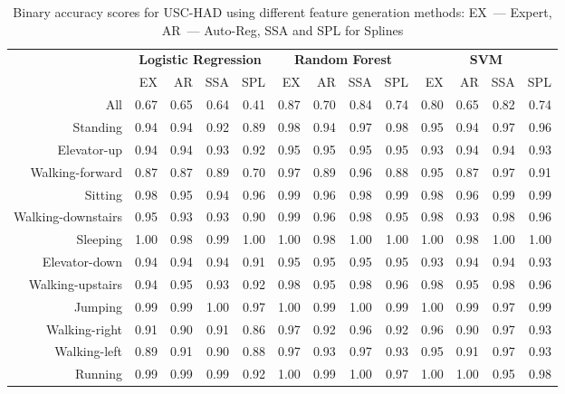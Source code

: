 \begin{table}[!ht]
	\centering
	\footnotesize
	\caption{Binary accuracy scores for USC-HAD using different feature generation methods: EX~--- Expert, AR~--- Auto-Reg, SSA and  SPL for Splines}
	\label{my-label}
	\begin{tabular}{r|rrrr|rrrr|rrrr|}
		& \multicolumn{4}{c|}{\textbf{Logistic Regression}} & \multicolumn{4}{c|}{\textbf{Random Forest}} & \multicolumn{4}{c|}{\textbf{SVM}}          \\ \cline{2-13} 
		& EX   & AR   & SSA   & SPL  & EX  & AR & SSA & SPL & EX & AR & SSA & SPL \\ \hline
		All& 0.67 & 0.65 & 0.64 & 0.41 & 0.87 & 0.70 & 0.84 & 0.74 & 0.80 & 0.65 & 0.82 & 0.74 \\
		Standing& 0.94 & 0.94 & 0.92 & 0.89 & 0.98 & 0.94 & 0.97 & 0.98 & 0.95 & 0.94 & 0.97 & 0.96 \\
		Elevator-up& 0.94 & 0.94 & 0.93 & 0.92 & 0.95 & 0.95 & 0.95 & 0.95 & 0.93 & 0.94 & 0.94 & 0.93 \\
		Walking-forward& 0.87 & 0.87 & 0.89 & 0.70 & 0.97 & 0.89 & 0.96 & 0.88 & 0.95 & 0.87 & 0.97 & 0.91 \\
		Sitting& 0.98 & 0.95 & 0.94 & 0.96 & 0.99 & 0.96 & 0.98 & 0.99 & 0.98 & 0.96 & 0.99 & 0.99 \\
		Walking-downstairs& 0.95 & 0.93 & 0.93 & 0.90 & 0.99 & 0.96 & 0.98 & 0.95 & 0.98 & 0.93 & 0.98 & 0.96 \\
		Sleeping& 1.00 & 0.98 & 0.99 & 1.00 & 1.00 & 0.98 & 1.00 & 1.00 & 1.00 & 0.98 & 1.00 & 1.00 \\
		Elevator-down& 0.94 & 0.94 & 0.94 & 0.91 & 0.95 & 0.95 & 0.95 & 0.95 & 0.93 & 0.94 & 0.94 & 0.93 \\
		Walking-upstairs& 0.94 & 0.95 & 0.93 & 0.92 & 0.98 & 0.95 & 0.98 & 0.96 & 0.98 & 0.95 & 0.98 & 0.96 \\
		Jumping& 0.99 & 0.99 & 1.00 & 0.97 & 1.00 & 0.99 & 1.00 & 0.99 & 1.00 & 0.99 & 0.97 & 0.99 \\
		Walking-right& 0.91 & 0.90 & 0.91 & 0.86 & 0.97 & 0.92 & 0.96 & 0.92 & 0.96 & 0.90 & 0.97 & 0.93 \\
		Walking-left& 0.89 & 0.91 & 0.90 & 0.88 & 0.97 & 0.93 & 0.97 & 0.93 & 0.95 & 0.91 & 0.97 & 0.93 \\
		Running& 0.99 & 0.99 & 0.99 & 0.92 & 1.00 & 0.99 & 1.00 & 0.97 & 1.00 & 1.00 & 0.95 & 0.98\\ \hline
	\end{tabular}
	\label{tbl::uschad_methods_results}
\end{table}

